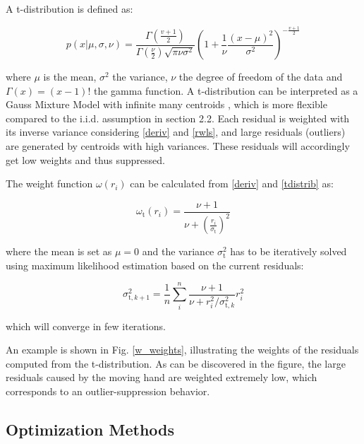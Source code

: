 \documentclass[acmsmall, nonacm, 11pt]{acmart}
\begin{document}
A t-distribution is defined as:

\begin{equation}
p(x | \mu, \sigma, \nu)=\frac{\Gamma\left(\frac{v+1}{2}\right)}{\Gamma\left(\frac{\nu}{2}\right) \sqrt{\pi \nu \sigma^{2}}}\left(1+\frac{1}{\nu} \frac{(x-\mu)^{2}}{\sigma^{2}}\right)^{-\frac{v+1}{2}}
\label{tdistrib}
\end{equation}

\noindent where $\mu$ is the mean, $\sigma^2$ the variance, $\nu$ the degree of freedom of the data and $\Gamma(x) = (x-1)!$ the gamma function. A t-distribution can be interpreted as a Gauss Mixture Model with infinite many centroids \cite{bishop2006pattern}, which is more flexible compared to the i.i.d. assumption in section 2.2. Each residual is weighted with its inverse variance considering \eqref{deriv} and \eqref{rwls}, and large residuals (outliers) are generated by centroids with high variances. These residuals will accordingly get low weights and thus suppressed.

The weight function $\omega(r_i)$ can be calculated from \eqref{deriv} and \eqref{tdistrib} as:

\begin{equation}
\omega_{\mathrm{t}}(r_i)=\frac{\nu+1}{\nu+\left(\frac{r_i}{\sigma_{\mathrm{t}}}\right)^{2}}
\label{weight_t}
\end{equation}

\noindent where the mean is set as $\mu = 0$ and the variance $\sigma_{\mathrm{t}}^2$ has to be iteratively solved using maximum likelihood estimation based on the current residuals:

\begin{equation}
\sigma_{\mathrm{t}, k+1}^{2}=\frac{1}{n} \sum_{i}^{n} \frac{\nu+1}{\nu+r_{i}^{2} / \sigma_{\mathrm{t}, k}^{2}} r_{i}^{2}
\end{equation}

\noindent which will converge in few iterations.

An example is shown in Fig. \ref{w_weights}, illustrating the weights of the residuals computed from the t-distribution. As can be discovered in the figure, the large residuals caused by the moving hand are weighted extremely low, which corresponds to an outlier-suppression behavior.

\subsection{Optimization Methods}
\end{document}
